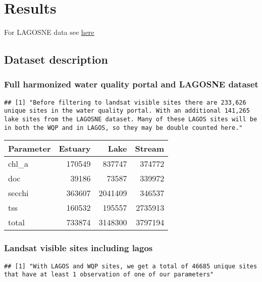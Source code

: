 \documentclass[]{article}
\begin{document}
\hypertarget{results}{%
\section{Results}\label{results}}

For LAGOSNE data see
\href{https://lagoslakes.org/the-lagos-database/}{here}

\hypertarget{dataset-description}{%
\subsection{Dataset description}\label{dataset-description}}

\hypertarget{full-harmonized-water-quality-portal-and-lagosne-dataset}{%
\subsubsection{Full harmonized water quality portal and LAGOSNE
dataset}\label{full-harmonized-water-quality-portal-and-lagosne-dataset}}

\begin{verbatim}
## [1] "Before filtering to landsat visible sites there are 233,626 unique sites in the water quality portal. With an additional 141,265 lake sites from the LAGOSNE dataset. Many of these LAGOS sites will be in both the WQP and in LAGOS, so they may be double counted here."
\end{verbatim}

\begin{longtable}[]{@{}lrrr@{}}
\toprule
Parameter & Estuary & Lake & Stream\tabularnewline
\midrule
\endhead
chl\_a & 170549 & 837747 & 374772\tabularnewline
doc & 39186 & 73587 & 339972\tabularnewline
secchi & 363607 & 2041409 & 346537\tabularnewline
tss & 160532 & 195557 & 2735913\tabularnewline
total & 733874 & 3148300 & 3797194\tabularnewline
\bottomrule
\end{longtable}

\hypertarget{landsat-visible-sites-including-lagos}{%
\subsubsection{Landsat visible sites including
lagos}\label{landsat-visible-sites-including-lagos}}

\begin{verbatim}
## [1] "With LAGOS and WQP sites, we get a total of 46685 unique sites that have at least 1 observation of one of our parameters"
\end{verbatim}
\end{document}
